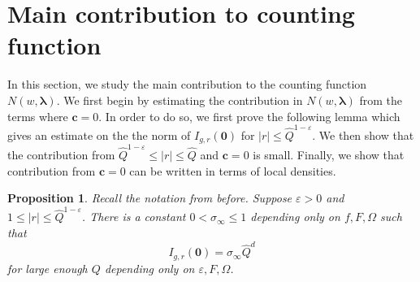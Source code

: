 \documentclass[10pt]{amsart}
\theoremstyle{plain}
\theoremstyle{plain}
\newtheorem{proposition}[theorem]{Proposition}
\renewcommand{\vec}[1]{\mathbf{#1}}
\theoremstyle{remark}
\theoremstyle{definition}
\newcommand{\hQ}{\widehat{Q}}
\begin{document}
\section{Main contribution to counting function}\label{mainboundsection}
In this section, we study the main contribution to the counting function $N(w,\boldsymbol{\lambda})$. We first begin by estimating the contribution in $N(w,\boldsymbol{\lambda})$ from the terms where $\vec{c}=0$. In order to do so, we first prove the following lemma which gives an estimate on the the norm of $I_{g,r}(\vec{0})$ for $|r|\leq\hQ^{1-\varepsilon}$. We then show that the contribution from $\hQ^{1-\varepsilon}\leq |r|\leq\hQ$ and $\vec{c}=0$ is small. Finally, we show that contribution from $\vec{c}=0$ can be written in terms of local densities.
\begin{proposition}\label{lem:Izerobound}Recall the notation from before. Suppose $\varepsilon>0$ and $1\leq |r|\leq\hQ^{1-\varepsilon}$. There is a constant $0<\sigma_{\infty}\leq 1$ depending only on $f,F,\Omega$ such that
\[I_{g,r}(\vec{0})=\sigma_{\infty}\hQ^d\]
for large enough $Q$ depending only on $\varepsilon,F,\Omega$.
\end{proposition}
\end{document}

